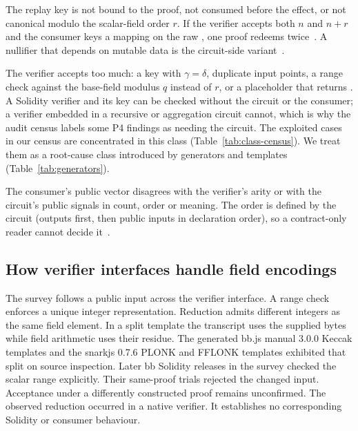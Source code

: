 The replay key is not bound to the proof, not consumed before the effect, or
not canonical modulo the scalar-field order $r$. If the verifier accepts both
$n$ and $n+r$ and the consumer keys a mapping on the raw , one
proof redeems twice~\cite{zkdrops-pr2,semaphore-16}. A nullifier that
depends on mutable data is the circuit-side variant~\cite{pse-anonaadhaar}.

The verifier accepts too much: a key with $\gamma=\delta$, duplicate input
points, a range check against the base-field modulus $q$ instead of $r$, or a
placeholder that returns . A Solidity verifier and its key can be
checked without the circuit or the consumer; a verifier embedded in a
recursive or aggregation circuit cannot, which is why the audit census labels
some P4 findings as needing the circuit. The exploited cases in our census are
concentrated in this class (Table~\ref{tab:class-census}). We treat them as a root-cause
class introduced by generators and templates
(Table~\ref{tab:generators}).

The consumer's public vector disagrees with the verifier's arity or with the
circuit's public signals in count, order or meaning. The order is defined by
the circuit (outputs first, then public inputs in declaration order), so a
contract-only reader cannot decide it~\cite{pse-anonaadhaar}.

\subsection{How verifier interfaces handle field encodings}\label{sec:generators}

The survey follows a public input across the verifier interface. A range
check enforces a unique integer representation. Reduction admits different
integers as the same field element. In a split template the transcript uses
the supplied bytes while field arithmetic uses their residue. The generated
bb.js manual 3.0.0 Keccak templates and the snarkjs 0.7.6 PLONK and FFLONK templates exhibited
that split on source inspection. Later bb Solidity releases in the survey checked the scalar range explicitly. Their same-proof trials rejected the
changed input. Acceptance under a differently constructed proof remains
unconfirmed. The observed reduction occurred in a native verifier. It
establishes no corresponding Solidity or consumer behaviour.
\begin{table}[t]
\centering
\caption{Public-input handling by behaviour. Counts are survey rows. A row
may cover several modes or releases. The older native Keccak modes rejected
the changed encoding in trials, with the mechanism unresolved.}
\label{tab:generators}
\footnotesize

\end{table}

